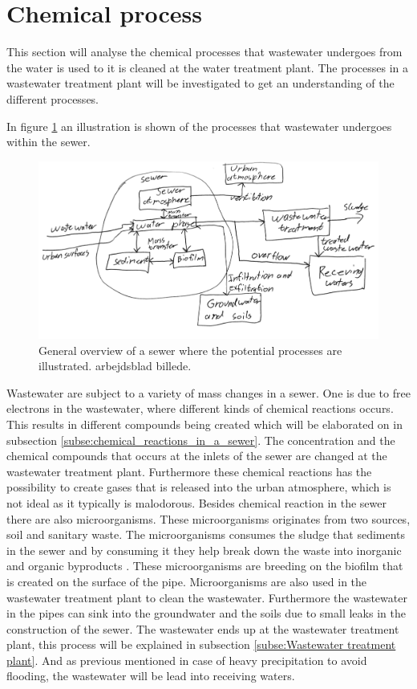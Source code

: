 \section{Chemical process}\label{se:chemical_process}
This section will analyse the chemical processes that wastewater undergoes from the water is used to it is cleaned at the water treatment plant. The processes in a wastewater treatment plant will be investigated to get an understanding of the different processes. %

In figure \ref{fig:sewer_overview_of_the_chemical_process} an illustration is shown of the processes that wastewater undergoes within the sewer.
\begin{figure}[H]
\centering
\includegraphics[width=1\textwidth]{report/introduction/pictures/detailed_sewer.pdf}
\caption{General overview of a sewer where the potential processes are illustrated. arbejdsblad billede. }
\label{fig:sewer_overview_of_the_chemical_process}
\end{figure}

Wastewater are subject to a variety of mass changes in a sewer. One is due to free electrons in the wastewater, where different kinds of chemical reactions occurs. This results in different compounds being created which will be elaborated on in subsection \ref{subse:chemical_reactions_in_a_sewer}. The concentration and the chemical compounds that occurs at the inlets of the sewer are changed at the wastewater treatment plant. Furthermore these chemical reactions has the possibility to create gases that is released into the urban atmosphere, which is not ideal as it typically is malodorous. Besides chemical reaction in the sewer there are also microorganisms. These microorganisms originates from two sources, soil and sanitary waste. The microorganisms consumes the sludge that sediments in the sewer and by consuming it they help break down the waste into inorganic and organic byproducts \cite{bacteria_sewer}. These microorganisms are breeding on the biofilm that is created on the surface of the pipe. Microorganisms are also used in the wastewater treatment plant to clean the wastewater. Furthermore the wastewater in the pipes can sink into the groundwater and the soils due to small leaks in the construction of the sewer. The wastewater ends up at the wastewater treatment plant, this process will be explained in subsection \ref{subse:Wastewater treatment plant}. And as previous mentioned in case of heavy precipitation to avoid flooding, the wastewater will be lead into receiving waters. 


